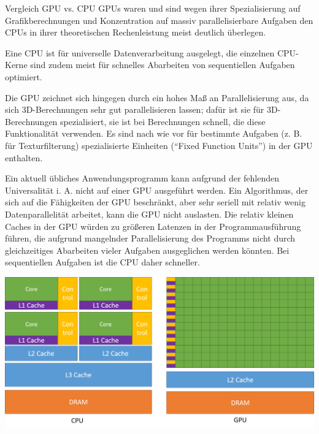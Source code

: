 \begin{bonus}{Vergleich GPU vs. CPU}
    GPUs waren und sind wegen ihrer Spezialisierung auf Grafikberechnungen und Konzentration auf massiv parallelisierbare Aufgaben den CPUs in ihrer theoretischen Rechenleistung meist deutlich überlegen.

    Eine CPU ist für universelle Datenverarbeitung ausgelegt, die einzelnen CPU-Kerne sind zudem meist für schnelles Abarbeiten von sequentiellen Aufgaben optimiert.

    Die GPU zeichnet sich hingegen durch ein hohes Maß an Parallelisierung aus, da sich 3D-Berechnungen sehr gut parallelisieren lassen; dafür ist sie für 3D-Berechnungen spezialisiert, sie ist bei Berechnungen schnell, die diese Funktionalität verwenden.
    Es sind nach wie vor für bestimmte Aufgaben (z. B. für Texturfilterung) spezialisierte Einheiten (\enquote{Fixed Function Units}) in der GPU enthalten.

    Ein aktuell übliches Anwendungsprogramm kann aufgrund der fehlenden Universalität i. A. nicht auf einer GPU ausgeführt werden.
    Ein Algorithmus, der sich auf die Fähigkeiten der GPU beschränkt, aber sehr seriell mit relativ wenig Datenparallelität arbeitet, kann die GPU nicht auslasten.
    Die relativ kleinen Caches in der GPU würden zu größeren Latenzen in der Programmausführung führen, die aufgrund mangelnder Parallelisierung des Programms nicht durch gleichzeitiges Abarbeiten vieler Aufgaben ausgeglichen werden könnten.
    Bei sequentiellen Aufgaben ist die CPU daher schneller.

    \centering
    \includegraphics[width=0.9\linewidth]{images/cpu_vs_gpu.png}
\end{bonus}

